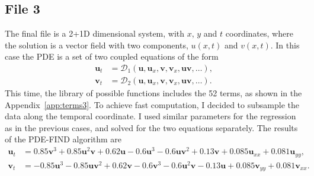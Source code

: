 \documentclass[unicode,11pt,a4paper,oneside,numbers=endperiod,openany]{scrartcl}
\begin{document}
\subsection*{File 3}
The final file is a 2+1D dimensional system, with $x$, $y$ and $t$ coordinates, where the solution is a vector
field with two components, $u(x, t)$ and $v(x, t)$. In this case the PDE is a set of two coupled
equations of the form
\begin{align}
    \mathbf{u}_t & = \mathcal{D}_1(\mathbf{u}, \mathbf{u}_x, \mathbf{v}, \mathbf{v}_x, \mathbf{u} \mathbf{v}, \ldots), \\
    \mathbf{v}_t & = \mathcal{D}_2(\mathbf{u}, \mathbf{u}_x, \mathbf{v}, \mathbf{v}_x, \mathbf{u} \mathbf{v}, \ldots). \nonumber
\end{align}
This time, the library of possible functions includes the 52 terms, as shown in
the Appendix~\ref{app:terms3}. 
To achieve fast computation, I decided to
subsample the data along the temporal coordinate. 
I used
similar parameters for the regression as in the previous cases, and solved for the two equations separately.
The results of the PDE-FIND algorithm are
\begin{align}
    \mathbf{u}_t &= 0.85 \mathbf{v}^3 + 0.85 \mathbf{u}^2 \mathbf{v} + 0.62 \mathbf{u} - 0.6 \mathbf{u}^3 - 0.6 \mathbf{u} \mathbf{v}^2 + 0.13 \mathbf{v} + 0.085 \mathbf{u}_{xx} + 0.081 \mathbf{u}_{yy}, \\
    \mathbf{v}_t &= -0.85 \mathbf{u}^3 - 0.85 \mathbf{u} \mathbf{v}^2 + 0.62 \mathbf{v} - 0.6 \mathbf{v}^3 - 0.6 \mathbf{u}^2 \mathbf{v} - 0.13 \mathbf{u} + 0.085 \mathbf{v}_{yy} + 0.081 \mathbf{v}_{xx}.
\end{align}
\end{document}

